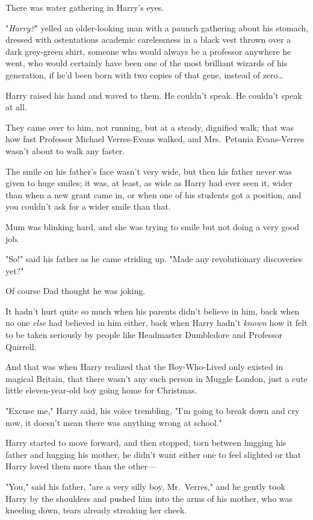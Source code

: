 There was water gathering in Harry's eyes.

"\emph{Harry?}" yelled an older-looking man with a paunch gathering about his 
stomach, dressed with ostentatious academic carelessness in a black vest thrown 
over a dark grey-green shirt, someone who would always be a professor anywhere 
he went, who would certainly have been one of the most brilliant wizards of his 
generation, if he'd been born with two copies of that gene, instead of 
zero{\ldots}

Harry raised his hand and waved to them. He couldn't speak. He couldn't speak 
at all.

They came over to him, not running, but at a steady, dignified walk; that was 
how fast Professor Michael Verres-Evans walked, and Mrs.~Petunia Evans-Verres 
wasn't about to walk any faster.

The smile on his father's face wasn't very wide, but then his father never was 
given to huge smiles; it was, at least, as wide as Harry had ever seen it, 
wider than when a new grant came in, or when one of his students got a 
position, and you couldn't ask for a wider smile than that.

Mum was blinking hard, and she was trying to smile but not doing a very good 
job.

"So!" said his father as he came striding up. "Made any revolutionary 
discoveries yet?"

Of course Dad thought he was joking.

It hadn't hurt quite so much when his parents didn't believe in him, back when 
no one \emph{else} had believed in him either, back when Harry hadn't 
\emph{known} how it felt to be taken seriously by people like Headmaster 
Dumbledore and Professor Quirrell.

And that was when Harry realized that the Boy-Who-Lived only existed in magical 
Britain, that there wasn't any such person in Muggle London, just a cute little 
eleven-year-old boy going home for Christmas.

"Excuse me," Harry said, his voice trembling, "I'm going to break down and cry 
now, it doesn't mean there was anything wrong at school."

Harry started to move forward, and then stopped, torn between hugging his 
father and hugging his mother, he didn't want either one to feel slighted or 
that Harry loved them more than the other---

"You," said his father, "are a very silly boy, Mr.~Verres," and he gently took 
Harry by the shoulders and pushed him into the arms of his mother, who was 
kneeling down, tears already streaking her cheek.

